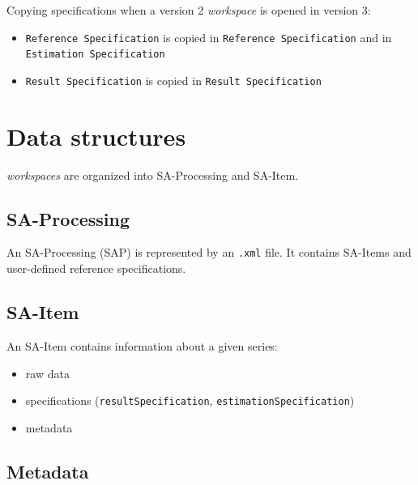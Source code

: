 \documentclass[
  letterpaper,
  DIV=11,
  numbers=noendperiod]{scrreprt}
\begin{document}
Copying specifications when a version 2 \emph{workspace} is opened in
version 3:

\begin{itemize}
\item
  \texttt{Reference\ Specification} is copied in
  \texttt{Reference\ Specification} and in
  \texttt{Estimation\ Specification}
\item
  \texttt{Result\ Specification} is copied in
  \texttt{Result\ Specification}
\end{itemize}

\hypertarget{data-structures-1}{%
\section*{Data structures}\label{data-structures-1}}


\emph{workspaces} are organized into SA-Processing and SA-Item.

\hypertarget{sec-concept-sap}{%
\subsection*{SA-Processing}\label{sec-concept-sap}}

An SA-Processing (SAP) is represented by an \texttt{.xml} file. It
contains SA-Items and user-defined reference specifications.

\hypertarget{sec-concept-sai}{%
\subsection*{SA-Item}\label{sec-concept-sai}}

An SA-Item contains information about a given series:

\begin{itemize}
\item
  raw data
\item
  specifications (\texttt{resultSpecification},
  \texttt{estimationSpecification})
\item
  metadata
\end{itemize}

\hypertarget{sec-concept-metadata}{%
\subsection*{Metadata}\label{sec-concept-metadata}}
\end{document}
